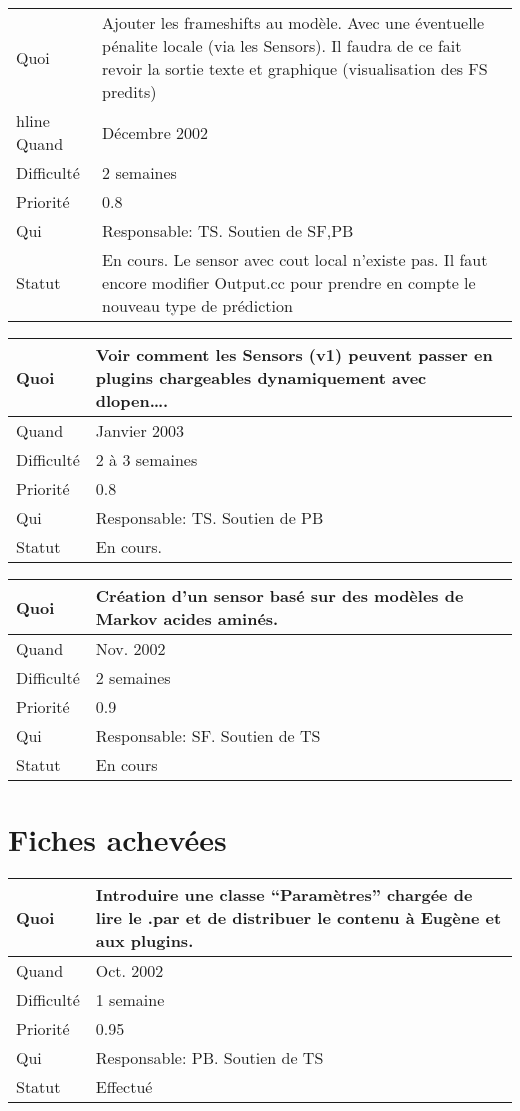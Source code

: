 \documentclass[a4paper,11pt]{article}
\begin{document}
\begin{longtable}{|l|p{7cm}|}\hline
  Quoi & Ajouter les frameshifts au mod\`ele. Avec une \'eventuelle
  p\'enalite locale (via les Sensors). Il faudra de ce fait revoir la
  sortie texte et graphique (visualisation des FS predits)\\hline
  Quand  &  D\'ecembre 2002 \\\hline
  Difficult\'e &  2 semaines\\\hline
  Priorit\'e &  0.8\\\hline
  Qui & Responsable: TS. Soutien de SF,PB\\\hline
  Statut & En cours. Le sensor avec cout local n'existe pas. Il faut
  encore modifier Output.cc pour prendre en compte le nouveau type de
  pr\'ediction\\\hline 
\end{longtable}

\begin{longtable}{|l|p{7cm}|}\hline
  Quoi & Voir comment les Sensors (v1) peuvent passer en plugins
  chargeables dynamiquement avec dlopen\ldots.\\\hline
  Quand  &  Janvier 2003\\\hline
  Difficult\'e &  2 \`a 3 semaines\\\hline
  Priorit\'e &  0.8\\\hline
  Qui & Responsable: TS. Soutien de PB \\\hline
  Statut & En cours.\\\hline
\end{longtable}

\begin{longtable}{|l|p{7cm}|}\hline
  Quoi & Cr\'eation d'un sensor bas\'e sur des mod\`eles de Markov acides amin\'es.\\\hline
  Quand  &  Nov. 2002\\\hline
  Difficult\'e &  2 semaines\\\hline
  Priorit\'e &  0.9 \\\hline
  Qui & Responsable: SF. Soutien de TS\\\hline
  Statut & En cours\\\hline
\end{longtable}

\section{Fiches achev\'ees}

\begin{longtable}{|l|p{7cm}|}\hline
  Quoi & Introduire une classe ``Param\`etres'' charg\'ee de lire le .par
  et de distribuer le contenu \`a Eug\`ene et aux plugins.  \\\hline
  Quand  &  Oct. 2002 \\\hline
  Difficult\'e &  1 semaine \\\hline
  Priorit\'e &  0.95 \\\hline
  Qui & Responsable: PB. Soutien de TS\\\hline
  Statut & Effectu\'e\\\hline
\end{longtable}
\end{document}
